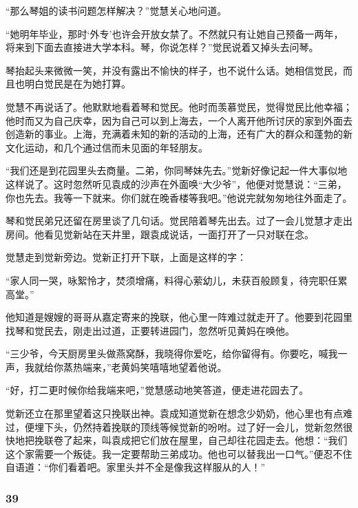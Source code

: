 \par “那么琴姐的读书问题怎样解决？”觉慧关心地问道。
\par “她明年毕业，那时‘外专’也许会开放女禁了。不然就只有让她自己预备一两年，将来到下面去直接进大学本科。琴，你说怎样？”觉民说着又掉头去问琴。
\par 琴抬起头来微微一笑，并没有露出不愉快的样子，也不说什么话。她相信觉民，而且也明白觉民是在为她打算。
\par 觉慧不再说话了。他默默地看着琴和觉民。他时而羡慕觉民，觉得觉民比他幸福；他时而又为自己庆幸，因为自己可以到上海去，一个人离开他所讨厌的家到外面去创造新的事业。上海，充满着未知的新的活动的上海，还有广大的群众和蓬勃的新文化运动，和几个通过信而未见面的年轻朋友。
\par “我们还是到花园里头去商量。二弟，你同琴妹先去。”觉新好像记起一件大事似地这样说了。这时忽然听见袁成的沙声在外面唤“大少爷”，他便对觉慧说：“三弟，你也先去。我等一下就来。你们就在晚香楼等我吧。”他说完就匆匆地往外面走了。
\par 琴和觉民弟兄还留在房里谈了几句话。觉民陪着琴先出去。过了一会儿觉慧才走出房间。他看见觉新站在天井里，跟袁成说话，一面打开了一只对联在念。
\par 觉慧走到觉新旁边。觉新正打开下联，上面是这样的字：
\par “家人同一哭，咏絮怜才，焚须增痛，料得心萦幼儿，未获百般顾复，待完职任累高堂。”
\par 他知道是嫂嫂的哥哥从嘉定寄来的挽联，他心里一阵难过就走开了。他要到花园里找琴和觉民去，刚走出过道，正要转进园门，忽然听见黄妈在唤他。
\par “三少爷，今天厨房里头做燕窝酥，我晓得你爱吃，给你留得有。你要吃，喊我一声，我就给你蒸热端来，”老黄妈笑嘻嘻地望着他说。
\par “好，打二更时候你给我端来吧，”觉慧感动地笑答道，便走进花园去了。
\par 觉新还立在那里望着这只挽联出神。袁成知道觉新在想念少奶奶，他心里也有点难过，便埋下头，仍然持着挽联的顶线等候觉新的吩咐。过了好一会儿，觉新忽然很快地把挽联卷了起来，叫袁成把它们放在屋里，自己却往花园走去。他想：“我们这个家需要一个叛徒。我一定要帮助三弟成功。他也可以替我出一口气。”便忍不住自语道：“你们看着吧。家里头并不全是像我这样服从的人！”


\subsubsection*{39}

